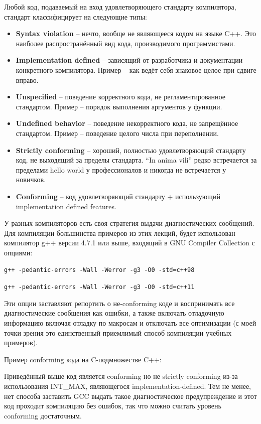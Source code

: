 \documentclass[a4paper,12pt,oneside]{article}
\begin{document}
Любой код, подаваемый на вход удовлетворяющего стандарту компилятора, стандарт классифицирует на следующие типы:
\begin{itemize}
\item
 \textbf{Syntax violation} -- нечто, вообще не являющееся кодом на языке C++. Это наиболее распространённый вид кода, производимого программистами.
\item
 \textbf{Implementation defined} – зависящий от разработчика и документации конкретного компилятора. Пример – как ведёт себя знаковое целое при сдвиге вправо.
\item
 \textbf{Unspecified} – поведение корректного кода, не регламентированное стандартом. 
 Пример – порядок выполнения аргументов у функции.
\item
 \textbf{Undefined behavior} – поведение некорректного кода, не запрещённое стандартом. 
 Пример – поведение целого числа при переполнении.
\item
 \textbf{Strictly conforming} – хороший, полностью удовлетворяющий стандарту код, не выходящий за пределы стандарта. ``In anima vili'' редко встречается за пределами hello world у профессионалов и никогда не встречается у новичков.
\item
 \textbf{Conforming} – код удовлетворяющий стандарту + использующий implementation defined features.
\end{itemize}

У разных компиляторов есть своя стратегия выдачи диагностических сообщений. Для компиляции большинства примеров из этих лекций, будет использован компилятор g++ версии 4.7.1 или выше, входящий в GNU Compiler Collection с опциями: 

\lstinline!g++ -pedantic-errors -Wall -Werror -g3 -O0 -std=c++98!

\lstinline!g++ -pedantic-errors -Wall -Werror -g3 -O0 -std=c++11!

Эти опции заставляют репортить о не-conforming коде и воспринимать все диагностические сообщения как ошибки, а также включать отладочную информацию включая отладку по макросам и отключать все оптимизации (с моей точки зрения это единственный приемлимый способ компиляции учебных примеров).

Пример conforming кода на C-подмножестве C++:



Приведённый выше код является conforming но не strictly conforming из-за использования INT\_MAX, являющегося implementation-defined. Тем не менее, нет способа заставить GCC выдать такое диагностическое предупреждение и этот код проходит компиляцию без ошибок, так что можно считать уровень conforming достаточным.
\end{document}
